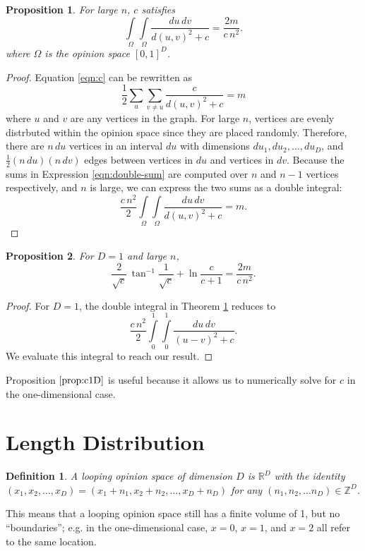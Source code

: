 \documentclass[a4paper,10pt]{article}
\newtheorem{defn}{Definition}
\newtheorem{prop}{Proposition}
\begin{document}
\begin{prop}
\label{prop:c}
For large $n$, $c$ satisfies
 \begin{equation*}
  \int\limits_\Omega \int\limits_\Omega \frac{du \, dv}{d(u, v)^2 + c} = \frac{2m}{c\,n^2}.
 \end{equation*}
where $\Omega$ is the opinion space $[0, 1]^D$.
\end{prop}
\begin{proof}
 Equation \ref{eqn:c} can be rewritten as
 \begin{equation}
 \label{eqn:double-sum}
  \frac{1}{2} \sum\limits_{u}\sum\limits_{v \neq u} \frac{c}{d(u, v)^2 + c} = m
 \end{equation}
 where $u$ and $v$ are any vertices in the graph. For large $n$, vertices are evenly distrbuted within the opinion space since they are placed randomly. Therefore, there are $n \,du$ vertices in an interval $du$ with dimensions $du_1, du_2, \ldots, du_D$, and $\frac{1}{2}(n\, du)(n\, dv)$ edges between vertices in $du$ and vertices in $dv$. Because the sums in Expression \ref{eqn:double-sum} are computed over $n$ and $n - 1$ vertices respectively, and $n$ is large, we can express the two sums as a double integral:
 \begin{equation}
  \frac{c\,n^2}{2} \int\limits_\Omega \int\limits_\Omega \frac{du \, dv}{d(u, v)^2 + c} = m.
 \end{equation}
\end{proof}
\begin{prop}
\label{prop:c1D}
 For $D=1$ and large $n$,
 \begin{equation*}
  \frac{2}{\sqrt{c}}\,\tan^{-1} \frac{1}{\sqrt{c}} + \ln\frac{c}{c+1} = \frac{2m}{c\,n^2}.
 \end{equation*}
\end{prop}
\begin{proof}
For $D=1$, the double integral in Theorem \ref{prop:c} reduces to
 \begin{equation}
  \frac{c\,n^2}{2} \int\limits_0^1 \int\limits_0^1 \frac{du \, dv}{(u - v)^2 + c}.
 \end{equation}
We evaluate this integral to reach our result.
\end{proof}
Proposition $\ref{prop:c1D}$ is useful because it allows us to numerically solve for $c$ in the one-dimensional case.

\section{Length Distribution}
\begin{defn}
 A looping opinion space of dimension $D$ is $\mathbb{R}^D$ with the identity $(x_1, x_2, \ldots, x_D) = (x_1 + n_1, x_2 + n_2, \ldots, x_D + n_D)$ for any $(n_1, n_2, \ldots n_D) \in \mathbb{Z}^D$. 
\end{defn}
This means that a looping opinion space still has a finite volume of 1, but no ``boundaries''; e.g. in the one-dimensional case, $x = 0$, $x = 1$, and $x = 2$ all refer to the same location.
\end{document}
